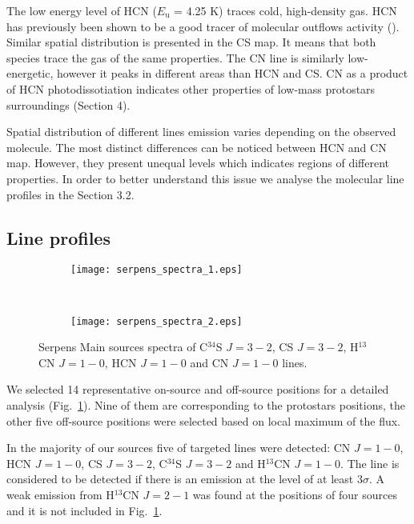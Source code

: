 \documentclass{aa}
\begin{document}
The low energy level of HCN ($E_\mathrm{u}$ = 4.25 K) traces cold, high-density gas. HCN has previously been shown to be a good tracer of molecular outflows activity (\citealt{Wal14}). Similar spatial distribution is presented in the CS map. It means that both species trace the gas of the same properties. The CN line is similarly low-energetic, however it peaks in different areas than HCN and CS. CN as a product of HCN photodissotiation indicates other properties of low-mass protostars surroundings (Section 4).

Spatial distribution of different lines emission varies depending on the observed molecule. The most distinct differences can be noticed between HCN and CN map. However, they present unequal levels which indicates regions of different properties. In order to better understand this issue we analyse the molecular line profiles in the Section 3.2. 



\subsection{Line profiles}

\begin{figure*}

 \begin{subfigure}{.5\textwidth}
  \label{Spectra_1}
	
  \texttt{[image: serpens\_spectra\_1.eps]}
 \end{subfigure}
  \\
 \begin{subfigure}{.5\textwidth}
  \label{Spectra_2}
  \texttt{[image: serpens\_spectra\_2.eps]}
 \end{subfigure}
\caption{Serpens Main sources spectra of C$^{34}$S $J=3-2$, CS $J=3-2$, H$^{13}$CN $J=1-0$, HCN $J=1-0$ and CN $J=1-0$ lines.}
\label{spectra}
\end{figure*}

We selected 14 representative on-source and off-source positions for a detailed analysis (Fig.~\ref{Spectra_1}). Nine of them are corresponding to the protostars positions, the other five off-source positions were selected based on local maximum of the flux.   

In the majority of our sources five of targeted lines were detected: CN $J=1-0$, HCN $J=1-0$, CS $J=3-2$, C$^{34}$S $J=3-2$ and H$^{13}$CN $J=1-0$. The line is considered to be detected if there is an emission at the level of at least 3$\sigma$. A weak emission from H$^{13}$CN $J=2-1$ was found at the positions of four sources and it is not included in Fig.~\ref{Spectra_1}. 
\end{document}
